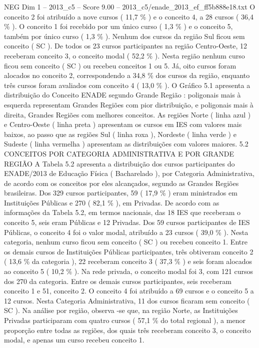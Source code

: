 \begin{textsample}{NEG Dim 1 – 2013\_c5 – Score 9.00 – 2013\_c5/enade\_2013\_ef\_ff5b888e18.txt}
O conceito 2 foi atribuído a nove cursos ( 11,7 \% ) e o conceito 4, a 28 cursos ( 36,4 \% ).
O conceito 1 foi recebido por um único curso ( 1,3 \% ) e o conceito 5, também por único curso ( 1,3 \% ).
Nenhum dos cursos da região Sul ficou sem conceito ( SC ).
De todos os 23 cursos participantes na região Centro-Oeste, 12 receberam conceito 3, o conceito modal ( 52,2 \% ).
Nesta região nenhum curso ficou sem conceito ( SC ) ou recebeu conceitos 1 ou 5.
Já, oito cursos foram alocados no conceito 2, correspondendo a 34,8 \% dos cursos da região, enquanto três cursos foram avaliados com conceito 4 ( 13,0 \% ).
O Gráfico 5.1 apresenta a distribuição do Conceito ENADE segundo Grande Região : poligonais mais à esquerda representam Grandes Regiões com pior distribuição, e poligonais mais à direita, Grandes Regiões com melhores conceitos.
As regiões Norte ( linha azul ) e Centro-Oeste ( linha preta ) apresentam os cursos em IES com valores mais baixos, ao passo que as regiões Sul ( linha roxa ), Nordeste ( linha verde ) e Sudeste ( linha vermelha ) apresentam as distribuições com valores maiores. 5.2 CONCEITOS POR CATEGORIA ADMINISTRATIVA E POR GRANDE REGIÃO A Tabela 5.2 apresenta a distribuição dos cursos participantes do ENADE/2013 de Educação Física ( Bacharelado ), por Categoria Administrativa, de acordo com os conceitos por eles alcançados, segundo as Grandes Regiões brasileiras.
Dos 329 cursos participantes, 59 ( 17,9 \% ) eram ministrados em Instituições Públicas e 270 ( 82,1 \% ), em Privadas.
De acordo com as informações da Tabela 5.2, em termos nacionais, das 18 IES que receberam o conceito 5, seis eram Públicas e 12 Privadas.
Dos 59 cursos participantes de IES Públicas, o conceito 4 foi o valor modal, atribuído a 23 cursos ( 39,0 \% ).
Nesta categoria, nenhum curso ficou sem conceito ( SC ) ou recebeu conceito 1.
Entre os demais cursos de Instituições Públicas participantes, três obtiveram conceito 2 ( 13,6 \% da categoria ), 22 receberam conceito 3 ( 37,3 \% ) e seis foram alocados ao conceito 5 ( 10,2 \% ).
Na rede privada, o conceito modal foi 3, com 121 cursos dos 270 da categoria.
Entre os demais cursos participantes, seis receberam conceito 1 e 51, conceito 2.
O conceito 4 foi atribuído a 69 cursos e o conceito 5 a 12 cursos.
Nesta Categoria Administrativa, 11 dos cursos ficaram sem conceito ( SC ).
Na análise por região, observa -se que, na região Norte, as Instituições Privadas participaram com quatro cursos ( 57,1 \% do total regional ), a menor proporção entre todas as regiões, dos quais três receberam conceito 3, o conceito modal, e apenas um curso recebeu conceito 1.

\end{textsample}

